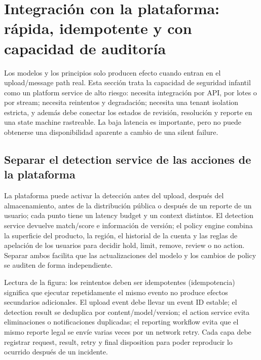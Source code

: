 \section{Integración con la plataforma: rápida, idempotente y con capacidad de auditoría}

Los modelos y los principios solo producen efecto cuando entran en el upload/message path real. Esta sección trata la capacidad de seguridad infantil como un platform service de alto riesgo: necesita integración por API, por lotes o por stream; necesita reintentos y degradación; necesita una tenant isolation estricta, y además debe conectar los estados de revisión, resolución y reporte en una state machine rastreable. La baja latencia es importante, pero no puede obtenerse una disponibilidad aparente a cambio de una silent failure.

\subsection{Separar el detection service de las acciones de la plataforma}

La plataforma puede activar la detección antes del upload, después del almacenamiento, antes de la distribución pública o después de un reporte de un usuario; cada punto tiene un latency budget y un context distintos. El detection service devuelve match/score e información de versión; el policy engine combina la superficie del producto, la región, el historial de la cuenta y las reglas de apelación de los usuarios para decidir hold, limit, remove, review o no action. Separar ambos facilita que las actualizaciones del modelo y los cambios de policy se auditen de forma independiente.


\begin{knowledgebox}{Lectura de la figura: los reintentos deben ser idempotentes}
 (idempotencia) significa que ejecutar repetidamente el mismo evento no produce efectos secundarios adicionales. El upload event debe llevar un event ID estable; el detection result se deduplica por content/model/version; el action service evita eliminaciones o notificaciones duplicadas; el reporting workflow evita que el mismo reporte legal se envíe varias veces por un network retry. Cada capa debe registrar request, result, retry y final disposition para poder reproducir lo ocurrido después de un incidente.
\end{knowledgebox}

